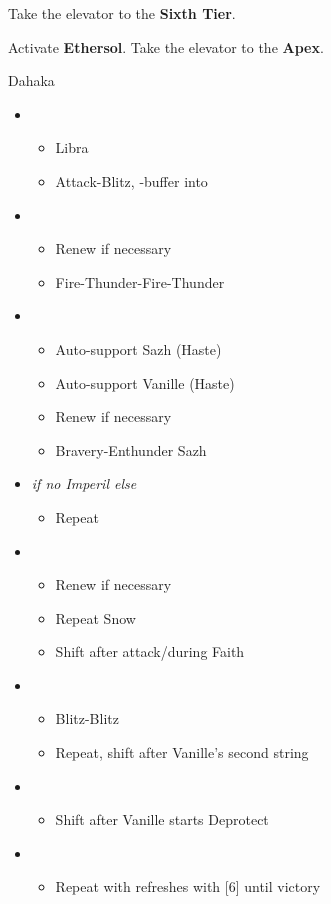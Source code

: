 \newpage
Take the elevator to the \textbf{Sixth Tier}.

Activate \textbf{Ethersol}.
Take the elevator to the \textbf{Apex}.

\begin{battle}{Dahaka}
\begin{itemize}
    \item \second
    \begin{itemize}
        \item Libra
        \item Attack-Blitz, \rav-buffer into
    \end{itemize}
    \item \fifth
    \begin{itemize}
        \item Renew if necessary
        \item Fire-Thunder-Fire-Thunder
    \end{itemize}
    \item \first
    \begin{itemize}
        \item Auto-support Sazh (Haste)
        \item Auto-support Vanille (Haste)
        \item Renew if necessary
        \item Bravery-Enthunder Sazh
    \end{itemize}
    \item \fifth \textit{ if no Imperil else } \third
    \begin{itemize}
        \item Repeat
    \end{itemize}
    \item \first
    \begin{itemize}
        \item Renew if necessary
        \item Repeat Snow
        \item Shift after attack/during Faith
    \end{itemize}
    \item \second
    \begin{itemize}
        \item Blitz-Blitz
        \item Repeat, shift after Vanille's second string
    \end{itemize}
    \item \fifth
    \begin{itemize}
        \item Shift after Vanille starts Deprotect
    \end{itemize}
    \item \fourth
    \begin{itemize}
        \item Repeat with refreshes with [6] until victory
    \end{itemize}
\end{itemize}
\end{battle}
